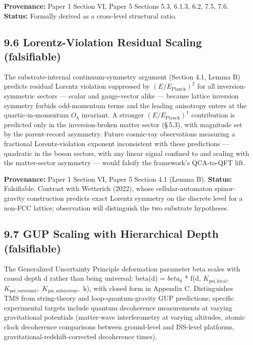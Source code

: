 \documentclass[11pt,oneside]{report}
\theoremstyle{definition}
\theoremstyle{remark}
\begin{document}
\textbf{Provenance:} Paper 1 Section VI, Paper 5 Sections 5.3, 6.1.3,
6.2, 7.5, 7.6. \textbf{Status:} Formally derived as a cross-level
structural ratio.

\subsection*{9.6 Lorentz-Violation Residual Scaling (falsifiable)}

The substrate-internal continuum-symmetry argument (Section 4.1, Lemma
B) predicts residual Lorentz violation suppressed by
\textbf{\ensuremath{(E/E_{\mathrm{Planck}})^{2}}} for all inversion-symmetric sectors ---
scalar and gauge-vector alike --- because lattice inversion symmetry
forbids odd-momentum terms and the leading anisotropy enters at the
quartic-in-momentum \ensuremath{O_{h}} invariant. A stronger
\textbf{\ensuremath{(E/E_{\mathrm{Planck}})^{1}}} contribution is predicted only in the
inversion-broken matter sector (\S\,5.3), with magnitude set by the
parent-record asymmetry. Future cosmic-ray observations measuring a
fractional Lorentz-violation exponent inconsistent with these
predictions --- quadratic in the boson sectors, with any linear signal
confined to and scaling with the matter-sector asymmetry --- would
falsify the framework's QCA-to-QFT lift.

\textbf{Provenance:} Paper 1 Section VI, Paper 5 Section 4.1 (Lemma B).
\textbf{Status:} Falsifiable. Contrast with Wetterich (2022), whose
cellular-automaton spinor-gravity construction predicts exact Lorentz
symmetry on the discrete level for a non-FCC lattice; observation will
distinguish the two substrate hypotheses.

\subsection*{9.7 GUP Scaling with Hierarchical Depth (falsifiable)}

The Generalized Uncertainty Principle deformation parameter beta scales
with causal depth d rather than being universal: beta(d) = \ensuremath{beta_{0}} *
f(d, \ensuremath{K_{\mathrm{psi},\mathrm{local}},} \ensuremath{K_{\mathrm{psi},\mathrm{surround}},} \ensuremath{K_{\mathrm{psi},\mathrm{subsystem}},} k), with closed
form in Appendix C. Distinguishes TMS from string-theory and
loop-quantum-gravity GUP predictions; specific experimental targets
include quantum decoherence measurements at varying gravitational
potentials (matter-wave interferometry at varying altitudes, atomic
clock decoherence comparisons between ground-level and ISS-level
platforms, gravitational-redshift-corrected decoherence times).
\end{document}
